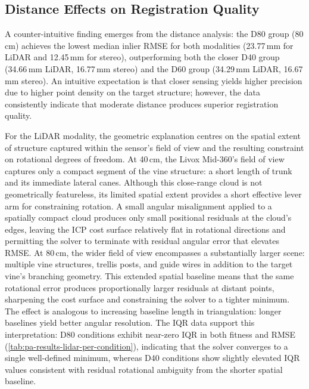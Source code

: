 \subsection{Distance Effects on Registration Quality}
\label{subsec:pa-discussion-distance}

A counter-intuitive finding emerges from the distance analysis: the D80 group (80\,cm) achieves the lowest median inlier RMSE for both modalities (23.77\,mm for LiDAR and 12.45\,mm for stereo), outperforming both the closer D40 group (34.66\,mm LiDAR, 16.77\,mm stereo) and the D60 group (34.29\,mm LiDAR, 16.67\,mm stereo). An intuitive expectation is that closer sensing yields higher precision due to higher point density on the target structure; however, the data consistently indicate that moderate distance produces superior registration quality.

For the LiDAR modality, the geometric explanation centres on the spatial extent of structure captured within the sensor's field of view and the resulting constraint on rotational degrees of freedom. At 40\,cm, the Livox Mid-360's field of view captures only a compact segment of the vine structure: a short length of trunk and its immediate lateral canes. Although this close-range cloud is not geometrically featureless, its limited spatial extent provides a short effective lever arm for constraining rotation. A small angular misalignment applied to a spatially compact cloud produces only small positional residuals at the cloud's edges, leaving the ICP cost surface relatively flat in rotational directions and permitting the solver to terminate with residual angular error that elevates RMSE. At 80\,cm, the wider field of view encompasses a substantially larger scene: multiple vine structures, trellis posts, and guide wires in addition to the target vine's branching geometry. This extended spatial baseline means that the same rotational error produces proportionally larger residuals at distant points, sharpening the cost surface and constraining the solver to a tighter minimum. The effect is analogous to increasing baseline length in triangulation: longer baselines yield better angular resolution. The IQR data support this interpretation: D80 conditions exhibit near-zero IQR in both fitness and RMSE (\cref{tab:pa-results-lidar-per-condition}), indicating that the solver converges to a single well-defined minimum, whereas D40 conditions show slightly elevated IQR values consistent with residual rotational ambiguity from the shorter spatial baseline.

